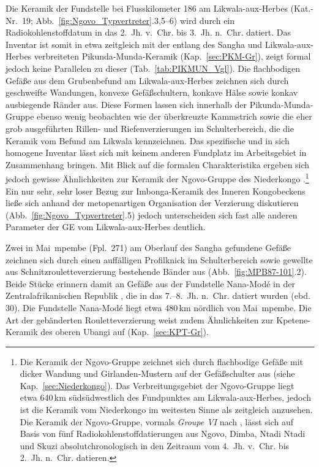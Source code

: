 Die Keramik der Fundstelle bei Flusskilometer 186 am \mbox{Likwala}-\mbox{aux}-\mbox{Herbes} (Kat.-Nr.~19; Abb.~\ref{fig:Ngovo_Typvertreter}.3,5--6) wird durch ein Radiokohlenstoffdatum in das 2.~Jh. v.~Chr. bis 3.~Jh. n.~Chr. datiert. Das Inventar ist somit in etwa zeitgleich mit der entlang des \mbox{Sangha} und \mbox{Likwala}-\mbox{aux}-\mbox{Herbes} verbreiteten Pikunda-Munda-Keramik (Kap.~\ref{sec:PKM-Gr}), zeigt formal jedoch keine Parallelen zu dieser (Tab.~\ref{tab:PIKMUN_Vgl}). Die flachbodigen Gefäße aus dem Grubenbefund am \mbox{Likwala}-\mbox{aux}-\mbox{Herbes} zeichnen sich durch geschweifte Wandungen, konvexe Gefäßschultern, konkave Hälse sowie konkav ausbiegende Ränder aus. Diese Formen lassen sich innerhalb der Pikunda-Munda-Gruppe ebenso wenig beobachten wie der überkreuzte Kammstrich  sowie die eher grob ausgeführten Rillen- und Riefenverzierungen im Schulterbereich, die die Keramik vom Befund am Likwala kennzeichnen. Das spezifische und in sich homogene Inventar lässt sich mit keinem anderen Fundplatz im Arbeitsgebiet in Zusammenhang bringen. Mit Blick auf die formalen Charakteristika ergeben sich jedoch gewisse Ähnlichkeiten zur Keramik der Ngovo-Gruppe des Niederkongo \parencite[Abb.~\ref{fig:Ngovo_Typvertreter}; siehe][]{deMaret.1986}.\footnote{Die Keramik der Ngovo-Gruppe zeichnet sich durch flachbodige Gefäße mit dicker Wandung und Girlanden-Mustern auf der Gefäßschulter aus (siehe Kap.~\ref{sec:Niederkongo}). Das Verbreitungsgebiet der Ngovo-Gruppe liegt etwa 640\,km südsüdwestlich des Fundpunktes am Likwala-aux-Herbes, jedoch ist die Keramik vom Niederkongo im weitesten Sinne als zeitgleich anzusehen. Die Keramik der Ngovo-Gruppe, vormals \textit{Groupe VI} nach \textcites{Mortelmans.1962}{Mortelmans.1962b}, lässt sich auf Basis von fünf Radiokohlenstoffdatierungen aus Ngovo, Dimba, Ntadi Ntadi und Skuzi absolutchronologisch in den Zeitraum vom 4.~Jh. v.~Chr. bis 2.~Jh. n.~Chr. datieren.} Ein nur sehr, sehr loser Bezug zur Imbonga-Keramik des Inneren Kongobeckens \parencite[Kap.~\ref{sec:IMB-Gr};][59--68]{Wotzka.1995} ließe sich anhand der metopenartigen Organisation der Verzierung diskutieren (Abb.~\ref{fig:Ngovo_Typvertreter}.5) jedoch unterscheiden sich fast alle anderen Parameter der GE vom \mbox{Likwala}-\mbox{aux}-\mbox{Herbes} deutlich.

Zwei in Mai~mpembe (Fpl.~271) am Oberlauf des \mbox{Sangha} gefundene Gefäße zeichnen sich durch einen auffälligen Profilknick im Schulterbereich sowie gewellte aus Schnitzrouletteverzierung bestehende Bänder aus (Abb.~\ref{fig:MPB87-101}.2). Beide Stücke erinnern damit an Gefäße aus der Fundstelle Nana-Modé in der Zentralafrikanischen Republik \parencite[34 Abb.~7.1,3, 36.8--9, 42 Abb.~11.6]{David.1977}, die in das \mbox{7.--8.~Jh.} n.~Chr. datiert wurden (ebd. 30). Die Fundstelle Nana-Modé liegt etwa 480\,km nördlich von Mai~mpembe. Die Art der gebänderten Rouletteverzierung weist zudem Ähnlichkeiten zur Kpetene-Keramik des oberen \mbox{Ubangi} auf (Kap.~\ref{sec:KPT-Gr}). 

